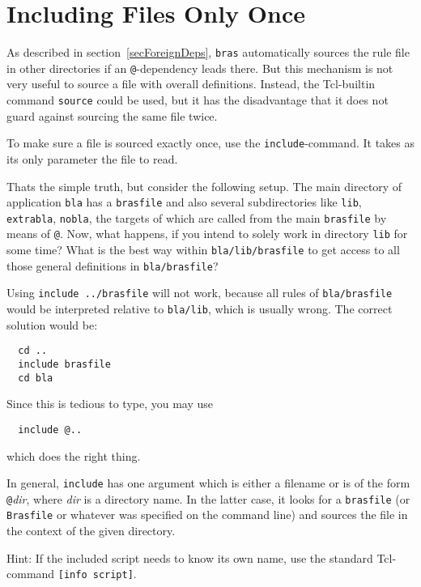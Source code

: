 \documentclass[11pt]{scrartcl}
\newcommand{\bras}{\texttt{bras}}
\newcommand{\brasfile}{\texttt{brasfile}}
\newcommand{\Brasfile}{\texttt{Brasfile}}
\begin{document}
\section{Including Files Only Once}
\label{secInclude}

As described in section~\ref{secForeignDeps}, \bras{} automatically
sources the rule file in other directories if an \texttt{@}-dependency
leads there. But this mechanism is not very useful to source a file
with overall definitions. Instead, the Tcl-builtin command
\texttt{source} could be used, but it has the disadvantage that it
does not guard against sourcing the same file twice.

To make sure a file is sourced exactly once, use the
\texttt{include}-command. It takes as its only parameter the file to
read. 

Thats the simple truth, but consider the following setup. The main
directory of application \texttt{bla} has a \texttt{brasfile} and also
several subdirectories like \texttt{lib}, \texttt{extrabla},
\texttt{nobla}, the targets of which are called from the main
\texttt{brasfile} by means of \texttt{@}. Now, what happens, if you
intend to solely work in directory \texttt{lib} for some time?  What
is the best way within \texttt{bla/lib/brasfile} to get access to all
those general definitions in \texttt{bla/brasfile}?

Using \texttt{include ../brasfile} will not work, because all
rules of \texttt{bla/brasfile} would be interpreted relative to
\texttt{bla/lib}, which is usually wrong. The correct solution would
be:
\begin{verbatim}
  cd ..
  include brasfile
  cd bla
\end{verbatim}
Since this is tedious to type, you may use
\begin{verbatim}
  include @..
\end{verbatim}
which does the right thing.

In general, \texttt{include} has one argument which is either a
filename or is of the form \texttt{@}\textit{dir}, where \textit{dir}
is a directory name. In the latter case, it looks for a \brasfile{} (or
\Brasfile{} or whatever was specified on the command line) and sources
the file in the context of the given directory.

Hint: If the included script needs to know its own name, use the
standard Tcl-command \texttt{[info script]}.
\end{document}
